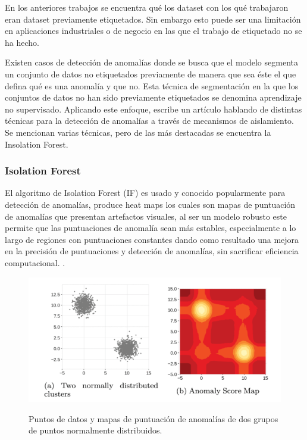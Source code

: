 \documentclass[11pt,a4paper,spanish]{book}
\numberwithin{equation}{chapter}
\numberwithin{figure}{chapter}
\begin{document}
En los anteriores trabajos se encuentra qué los dataset con los qué trabajaron eran 
dataset previamente etiquetados. Sin embargo esto puede ser una limitación en 
aplicaciones industriales o de negocio en las que el trabajo de etiquetado no se ha 
hecho.


Existen casos de detección de anomalías donde se busca que el modelo segmenta un 
conjunto de datos no etiquetados previamente de manera que sea éste el que defina qué 
es una anomalía y que no. Esta técnica de segmentación en la que los conjuntos de datos 
no han sido previamente etiquetados se denomina aprendizaje no supervisado. Aplicando 
este enfoque,  \cite{Cao_2025} escribe un artículo hablando de distintas técnicas para 
la detección de anomalías a través de mecanismos de aislamiento. Se mencionan varias 
técnicas, pero de las más destacadas se encuentra la Insolation Forest.


\subsubsection{Isolation Forest}

El algoritmo de Isolation Forest (IF) es usado y conocido popularmente para detección de 
anomalías, produce heat maps los cuales son mapas de puntuación de anomalías que 
presentan artefactos visuales, al ser un modelo robusto este permite que las 
puntuaciones de anomalía sean más estables, especialmente a lo largo de regiones con 
puntuaciones constantes dando como resultado una mejora en la precisión de puntuaciones 
y detección de anomalías, sin sacrificar eficiencia computacional. 
\cite{liu2021isoletionforest}.

\begin{figure}[h]
	\caption{Puntos de datos y mapas de puntuación de anomalías de dos grupos de puntos 
    normalmente distribuidos.  \protect\cite{liu2021isoletionforest} }
    \centering
    \includegraphics[width=1.0\textwidth]{media/liu-isolation-forest.png}
    \label{fig:figIsolationForest}
\end{figure}
\end{document}
